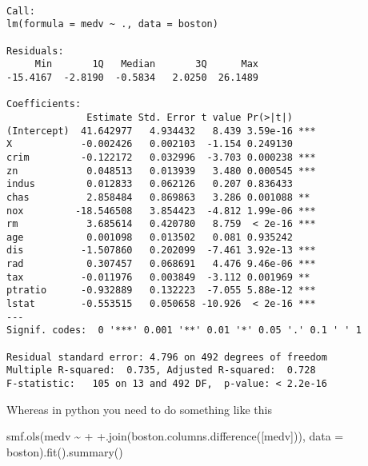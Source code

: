\documentclass[
  letterpaper,
  DIV=11,
  numbers=noendperiod]{scrreprt}
\newenvironment{Shaded}{\begin{snugshade}}{\end{snugshade}}
\newcommand{\NormalTok}[1]{\textcolor[rgb]{0.00,0.23,0.31}{#1}}
\newcommand{\OperatorTok}[1]{\textcolor[rgb]{0.37,0.37,0.37}{#1}}
\newcommand{\StringTok}[1]{\textcolor[rgb]{0.13,0.47,0.30}{#1}}
\begin{document}
\begin{verbatim}

Call:
lm(formula = medv ~ ., data = boston)

Residuals:
     Min       1Q   Median       3Q      Max 
-15.4167  -2.8190  -0.5834   2.0250  26.1489 

Coefficients:
              Estimate Std. Error t value Pr(>|t|)    
(Intercept)  41.642977   4.934432   8.439 3.59e-16 ***
X            -0.002426   0.002103  -1.154 0.249130    
crim         -0.122172   0.032996  -3.703 0.000238 ***
zn            0.048513   0.013939   3.480 0.000545 ***
indus         0.012833   0.062126   0.207 0.836433    
chas          2.858484   0.869863   3.286 0.001088 ** 
nox         -18.546508   3.854423  -4.812 1.99e-06 ***
rm            3.685614   0.420780   8.759  < 2e-16 ***
age           0.001098   0.013502   0.081 0.935242    
dis          -1.507860   0.202099  -7.461 3.92e-13 ***
rad           0.307457   0.068691   4.476 9.46e-06 ***
tax          -0.011976   0.003849  -3.112 0.001969 ** 
ptratio      -0.932889   0.132223  -7.055 5.88e-12 ***
lstat        -0.553515   0.050658 -10.926  < 2e-16 ***
---
Signif. codes:  0 '***' 0.001 '**' 0.01 '*' 0.05 '.' 0.1 ' ' 1

Residual standard error: 4.796 on 492 degrees of freedom
Multiple R-squared:  0.735, Adjusted R-squared:  0.728 
F-statistic:   105 on 13 and 492 DF,  p-value: < 2.2e-16
\end{verbatim}

Whereas in python you need to do something like this

\begin{Shaded}
\begin{Highlighting}[]
\NormalTok{smf.ols(}\StringTok{\textquotesingle{}medv \textasciitilde{}\textquotesingle{}} \OperatorTok{+} \StringTok{\textquotesingle{}+\textquotesingle{}}\NormalTok{.join(boston.columns.difference([}\StringTok{\textquotesingle{}medv\textquotesingle{}}\NormalTok{])), data }\OperatorTok{=}\NormalTok{ boston).fit().summary()}
\end{Highlighting}
\end{Shaded}
\end{document}
